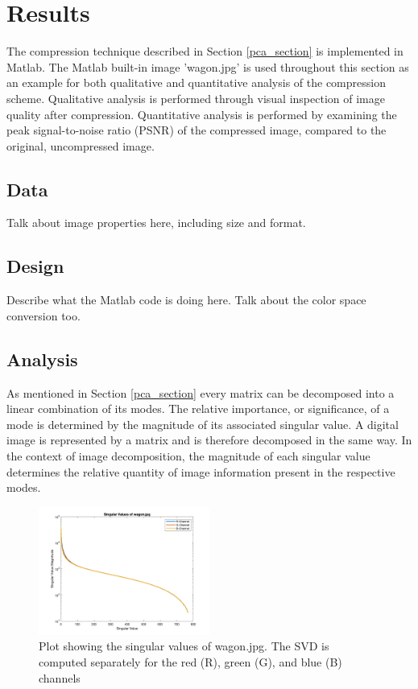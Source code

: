 \documentclass[conference]{IEEEtran}
\begin{document}


    \section{Results}

    The compression technique described in Section \ref{pca_section} is implemented in Matlab. The Matlab built-in image 'wagon.jpg' is used throughout this section as an example for both qualitative and quantitative analysis of the compression scheme. Qualitative analysis is performed through visual inspection of image quality after compression. Quantitative analysis is performed by examining the peak signal-to-noise ratio (PSNR) of the compressed image, compared to the original, uncompressed image.

    \subsection{Data}
    Talk about image properties here, including size and format.

    \subsection{Design}
    Describe what the Matlab code is doing here. Talk about the color space conversion too.

    \subsection{Analysis}
    As mentioned in Section \ref{pca_section} every matrix can be decomposed into a linear combination of its modes. The relative importance, or significance, of a mode is determined by the magnitude of its associated singular value. A digital image is represented by a matrix and is therefore decomposed in the same way. In the context of image decomposition, the magnitude of each singular value determines the relative quantity of image information present in the respective modes.

    \begin{figure}[t]
    \includegraphics[width=0.5\textwidth]{svals_wagon_rgb}
    \caption{Plot showing the singular values of wagon.jpg. The SVD is computed separately for the red (R), green (G), and blue (B) channels}
    \label{fig:svalplot}
    \end{figure}
    
\end{document}
